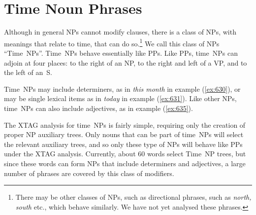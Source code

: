 \section{Time Noun Phrases} 
\label{timenps} 
 
 
 
Although in general NPs cannot modify clauses, there is a class of 
NPs, with meanings that relate to time, that can do so.\footnote{   There may be other classes of NPs, such as directional phrases, such   as {\em north, south} etc., which behave similarly. We have not yet   analysed these phrases.} We call this class of NPs ``Time~NPs''. 
Time~NPs behave essentially like PPs. Like PPs, time~NPs can adjoin at 
four places: to the right of an NP, to the right and left of a VP, and 
to the left of an~S. 
 
Time~NPs may include determiners, as in {\em this month} in example 
(\ref{ex:630}), or may be single lexical items as in {\em today} in example 
(\ref{ex:631}).  Like other NPs, time~NPs can also include adjectives, as in 
example (\ref{ex:635}). 
 
\beginsentences
{}\label{ex:630} 
\label{ex:631} 
\label{ex:632} 
\label{ex:633} 
\endsentences

\beginsentences
{}\label{ex:634} 
\label{ex:635} 
\endsentences

 
The XTAG analysis for time~NPs is fairly simple, requiring only the 
creation of proper NP auxiliary trees.  Only nouns that can be part of 
time~NPs will select the relevant auxiliary trees, and so only these 
type of NPs will behave like PPs under the XTAG analysis. 
Currently, about 60 words select Time~NP trees, but since these 
words can form NPs that include determiners and adjectives, a large 
number of phrases are covered by this class of modifiers. 
 
